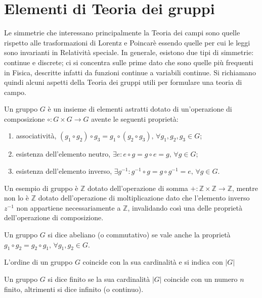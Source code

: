 \chapter{Elementi di Teoria dei gruppi}
Le simmetrie che interessano principalmente la Teoria dei campi sono quelle rispetto alle trasformazioni di Lorentz e Poincarè essendo quelle per cui le leggi sono invarianti in Relatività speciale. In generale, esistono due tipi di simmetrie: continue e discrete; ci si concentra sulle prime dato che sono quelle più frequenti in Fisica, descritte infatti da funzioni continue a variabili continue. Si richiamano quindi alcuni aspetti della Teoria dei gruppi utili per formulare una teoria di campo.
\begin{defn}[gruppo]
\label{defn: gruppo}
    Un gruppo $G$ è un insieme di elementi astratti dotato di un'operazione di composizione $\circ : G\times G \to G$ avente le seguenti proprietà:
    \begin{enumerate}
        \item associatività, $(g_1\circ g_2)\circ g_3=g_1\circ(g_2\circ g_3),\, \forall g_1,g_2,g_3\in G$;
        \item esistenza dell'elemento neutro, $\exists e : e\circ g = g\circ e = g,\,\forall g\in G$;
        \item esistenza dell'elemento inverso, $\exists g^{-1} : g^{-1}\circ g = g\circ g^{-1} = e,\,\forall g\in G$.
    \end{enumerate}
\end{defn}
\begin{ex}[gruppi]
    Un esempio di gruppo è $\mathbb{Z}$ dotato dell'operazione di somma $+ : \mathbb{Z}\times \mathbb{Z}\to \mathbb{Z}$, mentre non lo è $\mathbb{Z}$ dotato dell'operazione di moltiplicazione dato che l'elemento inverso $z^{-1}$ non appartiene necessariamente a $\mathbb{Z}$, invalidando così una delle proprietà dell'operazione di composizione.
\end{ex}
\begin{defn}
    Un gruppo $G$ si dice abeliano (o commutativo) se vale anche la proprietà $g_1\circ g_2=g_2\circ g_1,\,\forall g_1,g_2\in G$.
\end{defn}
\begin{defn}
    L'ordine di un gruppo $G$ coincide con la sua cardinalità e si indica con $|G|$
\end{defn}
\begin{defn}[finitezza]
    Un gruppo $G$ si dice finito se la sua cardinalità $|G|$ coincide con un numero $n$ finito, altrimenti si dice infinito (o continuo).
\end{defn}

